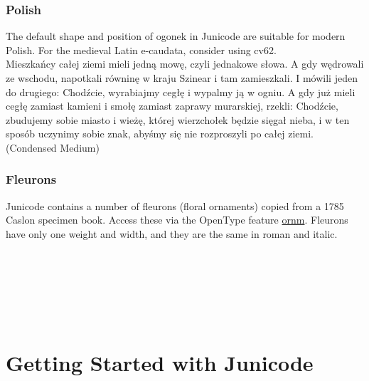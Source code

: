 \documentclass[12pt,letterpaper,openany]{book}
\begin{document}
\subsection*{Polish}
{\small\semiconditalic The default shape and position of ogonek in Junicode are suitable
for modern Polish. For the medieval Latin e-caudata, consider using
cv62.}\\[1ex]
{\condmed{} Mieszkańcy całej ziemi mieli jedną mowę, czyli jednakowe słowa.  A
gdy wędrowali ze wschodu, napotkali równinę w kraju Szinear i tam
zamieszkali.  I mówili jeden do drugiego: Chodźcie, wyrabiajmy cegłę
i wypalmy ją w ogniu. A gdy już mieli cegłę zamiast kamieni i smołę
zamiast zaprawy murarskiej, rzekli: Chodźcie, zbudujemy sobie miasto
i wieżę, której wierzchołek będzie sięgał nieba, i w ten sposób
uczynimy sobie znak, abyśmy się nie rozproszyli po całej ziemi.} (Condensed Medium)

\subsection*{Fleurons}

{\small\semiconditalic Junicode contains a number of fleurons (floral
  ornaments) copied from a 1785 Caslon specimen book. Access
  these via the OpenType feature \hyperlink{SectionD}{ornm}. Fleurons have only one weight and
  width, and they are the same in roman and italic.}

\begin{center}
\huge    \\
 \\[0.7ex]
\\[0.7ex]
\\
 
\end{center}

\chapter*{\color{RViolet}Getting Started with Junicode}\hypertarget{GettingStarted}{}
\end{document}
